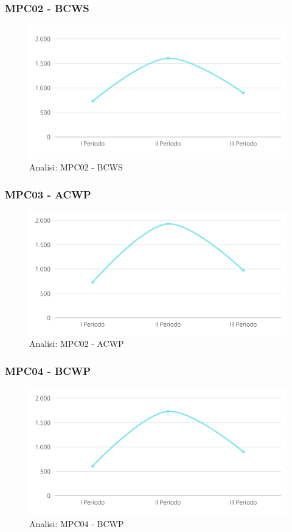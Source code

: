 \subsubsection{MPC02 - BCWS}
\begin{figure}[H]
    \centering
    \includegraphics[scale=0.50]{Sezioni/images/analisi-bcws.png}
    \caption{Analisi: MPC02 - BCWS}
\end{figure}

\subsubsection{MPC03 - ACWP}
\begin{figure}[H]
    \centering
    \includegraphics[scale=0.50]{Sezioni/images/analisi-acwp.png}
    \caption{Analisi: MPC02 - ACWP}
\end{figure}

\subsubsection{MPC04 - BCWP}
\begin{figure}[H]
    \centering
    \includegraphics[scale=0.50]{Sezioni/images/analisi-BCWP.png}
    \caption{Analisi: MPC04 - BCWP}
\end{figure}


